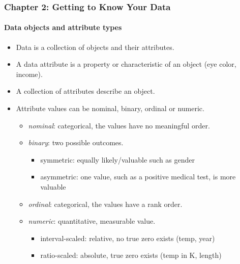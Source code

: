 \documentclass[11pt]{article}
\providecommand{\tightlist}{%
      \setlength{\itemsep}{0pt}\setlength{\parskip}{0pt}}
\begin{document}
    \subsubsection{Chapter 2: Getting to Know Your
Data}\label{chapter-2-getting-to-know-your-data}

    \paragraph{Data objects and attribute
types}\label{data-objects-and-attribute-types}

    \begin{itemize}
\tightlist
\item
  Data is a collection of objects and their attributes.
\item
  A data attribute is a property or characteristic of an object (eye
  color, income).
\item
  A collection of attributes describe an object.
\item
  Attribute values can be nominal, binary, ordinal or numeric.

  \begin{itemize}
  \tightlist
  \item
    \emph{nominal}: categorical, the values have no meaningful order.
  \item
    \emph{binary}: two possible outcomes.

    \begin{itemize}
    \tightlist
    \item
      symmetric: equally likely/valuable such as gender
    \item
      asymmetric: one value, such as a positive medical test, is more
      valuable
    \end{itemize}
  \item
    \emph{ordinal}: categorical, the values have a rank order.
  \item
    \emph{numeric}: quantitative, measurable value.

    \begin{itemize}
    \tightlist
    \item
      interval-scaled: relative, no true zero exists (temp, year)
    \item
      ratio-scaled: absolute, true zero exists (temp in K, length)
    \end{itemize}
  \end{itemize}
\end{itemize}
\end{document}

